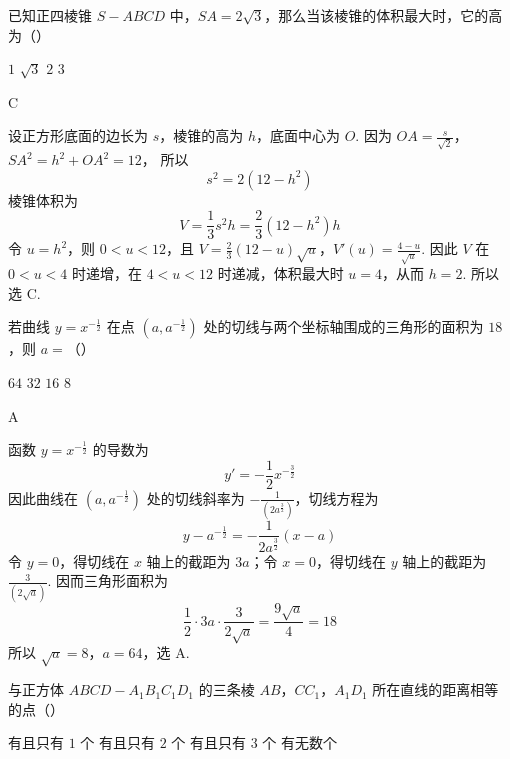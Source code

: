\begin{problem}
已知正四棱锥 \(S - ABCD\) 中，\(SA = 2\sqrt{3}\)，那么当该棱锥的体积最大时，它的高为（\quad）

\choices
    {\(1\)}
    {\(\sqrt{3}\)}
    {\(2\)}
    {\(3\)}
\end{problem}

\begin{answer}
C
\end{answer}

\begin{solution}
设正方形底面的边长为 \(s\)，棱锥的高为 \(h\)，底面中心为 \(O\). 因为
\(OA=\frac{s}{\sqrt{2}}\)，\(SA^2=h^2+OA^2=12\)，
所以
\[
s^2=2(12-h^2)
\]
棱锥体积为
\[
V=\frac{1}{3}s^2h=\frac{2}{3}(12-h^2)h
\]
令 \(u=h^2\)，则 \(0<u<12\)，且
\(V=\frac{2}{3}(12-u)\sqrt{u}\)，\(V'(u)=\frac{4-u}{\sqrt{u}}\).
因此 \(V\) 在 \(0<u<4\) 时递增，在 \(4<u<12\) 时递减，体积最大时 \(u=4\)，从而 \(h=2\). 所以选 C.
\end{solution}

\begin{problem}
若曲线 \( y = x^{-\frac{1}{2}} \) 在点 \( \left(a, a^{-\frac{1}{2}}\right) \) 处的切线与两个坐标轴围成的三角形的面积为 \(18\)，则 \(a =\)（\quad）

\choices
    {\(64\)}
    {\(32\)}
    {\(16\)}
    {\(8\)}
\end{problem}

\begin{answer}
A
\end{answer}

\begin{solution}
函数 \(y=x^{-\frac{1}{2}}\) 的导数为
\[
y'=-\frac{1}{2}x^{-\frac{3}{2}}
\]
因此曲线在 \(\left(a,a^{-\frac{1}{2}}\right)\) 处的切线斜率为 \(-\frac{1}{(2a^{\frac{3}{2}})}\)，切线方程为
\[
y-a^{-\frac{1}{2}}=-\frac{1}{2a^{\frac{3}{2}}}(x-a)
\]
令 \(y=0\)，得切线在 \(x\) 轴上的截距为 \(3a\)；令 \(x=0\)，得切线在 \(y\) 轴上的截距为 \(\frac{3}{(2\sqrt a)}\). 因而三角形面积为
\[
\frac{1}{2}\cdot3a\cdot\frac{3}{2\sqrt a}=\frac{9\sqrt a}{4}=18
\]
所以 \(\sqrt a=8\)，\(a=64\)，选 A.
\end{solution}

\begin{problem}
与正方体 \(ABCD - A_{1}B_{1}C_{1}D_{1}\) 的三条棱 \(AB\)，\(CC_{1}\)，\(A_{1}D_{1}\) 所在直线的距离相等的点（\quad）

\choices
    {有且只有 \(1\text{ 个}\)}
    {有且只有 \(2\text{ 个}\)}
    {有且只有 \(3\text{ 个}\)}
    {有无数个}
\end{problem}

